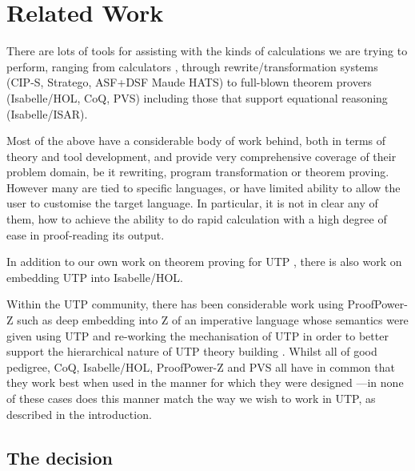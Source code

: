 \section{Related Work}\label{sec:Related}

There are lots of tools for assisting with the kinds of
calculations we are trying to perform,
ranging from calculators
\cite{Bird14},
through rewrite/transformation
systems
(CIP-S\cite{DBLP:books/sp/BauerEH87},
Stratego\cite{conf/rta/Visser01},
ASF+DSF\cite{VanDenBrand:2002:CLD}
Maude\cite{conf/rta/ClavelDELMMT03}
HATS\cite{conf/gttse/WinterB06})
to full-blown theorem provers
(Isabelle/HOL\cite{books/sp/NipkowPW02},
CoQ\cite{bk:Coq'Art:04},
PVS\cite{conf/fmcad/Shankar96})
including those that support equational reasoning
(Isabelle/ISAR\cite{man:Isabelle:Isar:Wenzel:10}).

Most of the above have a considerable body of work behind,
both in terms of theory and tool development,
and provide very comprehensive coverage of their problem domain,
be it rewriting, program transformation or theorem proving.
However many are tied to specific languages,
or have limited ability to allow the user to customise the target language.
In particular,
it is not in clear any of them,
how to achieve the ability to do rapid calculation
with a high degree of ease in proof-reading its
output.

In addition to our own work on theorem proving for UTP \cite{DBLP:conf/utp/Butterfield10},
there is also work on embedding UTP into Isabelle/HOL\cite{DBLP:conf/utp/FosterZW14}.

Within the UTP community,
there has been considerable work using Proof{\-}Power-Z
such as deep embedding into Z of an imperative language whose semantics
were given using UTP \cite{conf/utp/NukaW06}and
 re-working the mechanisation of UTP in order to better support
the hierarchical nature of UTP theory building \cite{journals/entcs/ZeydaC09}.
%
Whilst all of good pedigree, CoQ, Isabelle/HOL, ProofPower-Z and PVS
all have in common that they work best when used in the manner
for which they were designed%
---in none of these cases does this manner match the way
we wish to work in UTP, as described in the introduction.



\subsection{The decision}

